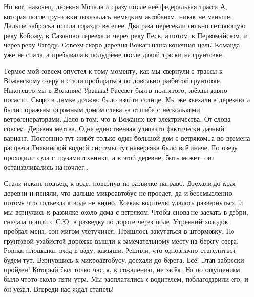 Но вот, наконец, деревня Мочала и сразу после неё федеральная трасса А, которая после грунтовки показалась немецким автобаном, никак не меньше. Дальше заброска пошла гораздо веселее. Два раза пересекли сильно петляющую реку Кобожу, в Сазоново переехали через реку Песь, а потом, в Первомайском, и через реку Чагоду. Совсем скоро деревня Вожань\mdash наша конечная цель! Команда уже не спала, а пребывала в полудрёме после дикой тряски на грунтовке.

Термос мой совсем опустел к тому моменту, как мы свернули с трассы к Вожанскому озеру и стали пробираться по довольно разбитой грунтовке. Наконец\sdash то мы в Вожанях! Ура\sdash а\sdash а\sdash а\sdash а! Рассвет был в полпятого, звёзды давно погасли. Скоро в дымке должно было взойти солнце. Мы же въехали в деревню и были поражены огромным домом слева на отшибе с несколькими ветрогенераторами. Дело в том, что в Вожанях нет электричества. От слова совсем. Деревня мертва. Одна единственная улица\mdash это фактически дачный вариант. Постоянно тут живёт только один большой дом с ветряком\ldots  а во времена расцвета Тихвинской водной системы тут наверняка было всё иначе. По озеру проходили суда с грузами\mdash тихвинки, а в этой деревне, быть может, они останавливались на ночлег\ldots 

Стали искать подъезд к воде, повернув на развилке направо. Доехали до края деревни и поняли, что дальше микроавтобус не проедет, да и бессмысленно, потому что подъезда к воде не видно. Кое\sdash как водителю удалось развернуться, и мы вернулись к развилке около дома с ветряком. Чтобы снова не заехать в дебри, сначала пошли с С.Ю. в разведку по дороге через поле. Утренний холодок пробрал меня, сон мигом улетучился. Пришлось закутаться в штормовку. По грунтовой ухабистой дорожке вышли к замечательному месту на берегу озера. Ровная площадка, вход в воду, камыши. Решили, что однозначно стапелиться будем тут. Вернувшись к микроавтобусу, доехали до берега. Всё! Этап заброски пройден! Который был точно час, я, к сожалению, не засёк. Но по ощущениям было что\sdash то около пяти утра. Мы расплатились с водителем, поблагодарили его, и он уехал. Впереди нас ждал стапель!

\begin{center}
\end{center}
